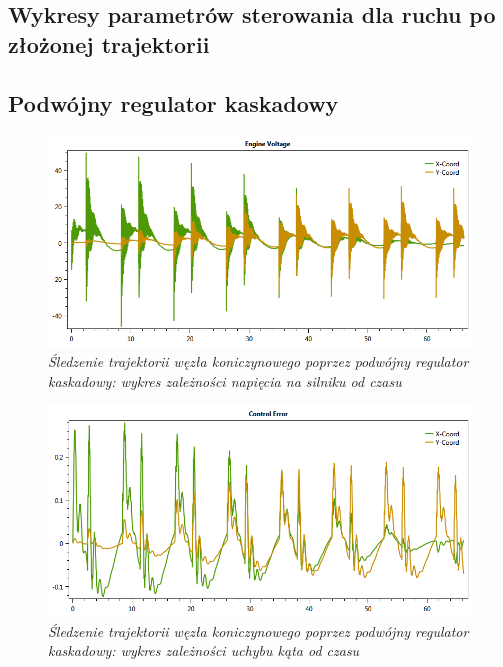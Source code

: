 \documentclass[12pt, oneside]{report}
\theoremstyle{definition}
\begin{document}
\appendix
\begin{appendices}
  \chapter{Wykresy parametrów sterowania dla ruchu po złożonej trajektorii}
\label{appenix:A}
  
\section{Podwójny regulator kaskadowy}
\begin{figure}[H]
	\centering
		\includegraphics[width = 400pt]{TrefoilKnotCascadeEV} 
		\caption{\textit{Śledzenie trajektorii węzła koniczynowego poprzez podwójny regulator kaskadowy: wykres zależności napięcia na silniku od czasu}}
		\label{plot:TrefoilKnotCascadeEV}
\end{figure}

\begin{figure}[H]
	\centering
		\includegraphics[width = 400pt]{TrefoilKnotCascadeCE} 
		\caption{\textit{Śledzenie trajektorii węzła koniczynowego poprzez podwójny regulator kaskadowy: wykres zależności uchybu kąta od czasu}}
		\label{plot:TrefoilKnotCascadeCE}
\end{figure}


\end{appendices}
\end{document}
